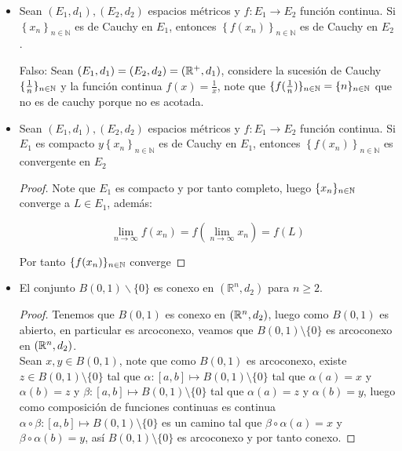 \begin{itemize}[leftmargin=*]
\begin{proof}
En efecto como $f$ es continua y $K$ es compacto, $f(K)$ es compacto, por tanto es cerrado y acotado.
\end{proof}

\item  Sean $\left(E_1, d_1\right),\left(E_2, d_2\right)$ espacios métricos y $f: E_1 \rightarrow E_2$ función continua. Si $\left\{x_n\right\}_{n \in \mathbb{N}}$ es de Cauchy en $E_1$, entonces $\left\{f\left(x_n\right)\right\}_{n \in \mathbb{N}}$ es de Cauchy en $E_2$.

Falso: Sean $(E_1,d_1)=(E_2,d_2)=(\mathbb{R}^+,d_1)$, considere la sucesión de Cauchy $\{\frac{1}{n}\}_{n\in \mathbb{N}}$ y la función continua $f(x)=\frac{1}{x}$, note que $\{f(\frac{1}{n})\}_{n\in \mathbb{N}}=\{n\}_{n\in \mathbb{N}}$ que no es de cauchy porque no es acotada.

\item Sean $\left(E_1, d_1\right),\left(E_2, d_2\right)$ espacios métricos y $f: E_1 \rightarrow E_2$ función continua. Si $E_1$ es compacto $y\left\{x_n\right\}_{n \in \mathbb{N}}$ es de Cauchy en $E_1$, entonces $\left\{f\left(x_n\right)\right\}_{n \in \mathbb{N}}$ es convergente en $E_2$\\

\begin{proof}
Note que $E_1$ es compacto y por tanto completo, luego $\{x_n\}_{n\in\mathbb{N}}$ converge a $L \in E_1$, además:

$$\lim_{n\to \infty}f(x_n)=f\left(\lim_{n\to \infty} x_n\right)=f(L)$$

Por tanto $\{f(x_n)\}_{n\in \mathbb{N}}$ converge
\end{proof}

\item El conjunto $B(0,1) \backslash\{0\}$ es conexo en $\left(\mathbb{R}^n, d_2\right)$ para $n \geq 2$.\\

\begin{proof}
Tenemos que $B(0,1)$ es conexo en $(\mathbb{R}^n,d_2)$, luego como $B(0,1)$ es abierto, en particular es arcoconexo, veamos que $B(0,1)\setminus \{0\}$ es arcoconexo en $(\mathbb{R}^n,d_2)$.\\
Sean $x,y\in B(0,1)$, note que como $B(0,1)$ es arcoconexo, existe $z\in B(0,1)\setminus\{0\}$ tal que $\alpha: [a,b]\mapsto B(0,1)\setminus\{0\}$ tal que $\alpha(a)=x$ y $\alpha(b)=z$ y $\beta: [a,b]\mapsto B(0,1)\setminus\{0\}$ tal que $\alpha(a)=z$ y $\alpha(b)=y$, luego como composición de funciones continuas es continua $\alpha \circ \beta: [a,b]\mapsto B(0,1)\setminus \{0\}$ es un camino tal que $ \beta \circ \alpha (a)=x$ y $ \beta \circ \alpha(b)=y$, así $B(0,1)\setminus \{0\}$ es arcoconexo y por tanto conexo. 
\end{proof}


\end{itemize}
